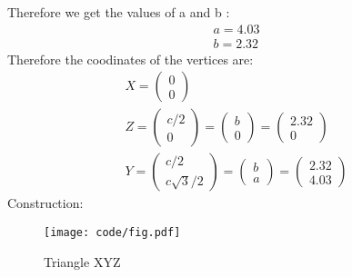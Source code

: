 \documentclass{article}
\newcommand{\myvec}[1]{\ensuremath{\begin{pmatrix}#1\end{pmatrix}}}
\begin{document}
  Therefore we get the values of a and b :
  \begin{align}
      a=4.03\\
      b=2.32
  \end{align}
  Therefore the coodinates of the vertices are:
  \begin{align}
      X=\myvec{0\\0}\\
      Z=\myvec{c/2\\0}=\myvec{b\\0}=\myvec{2.32 \\ 0}\\
      Y=\myvec{c/2 \\ c\sqrt{3}/2}=\myvec{b \\ a}=\myvec{2.32 \\ 4.03}
  \end{align}
 Construction:\\
 \begin{figure}[h]
	 \begin{center}
		 \texttt{[image: code/fig.pdf]}
	 \end{center}
	 \caption{Triangle XYZ}
	 \label{fig:Fig1}
 \end{figure}
\end{document}

